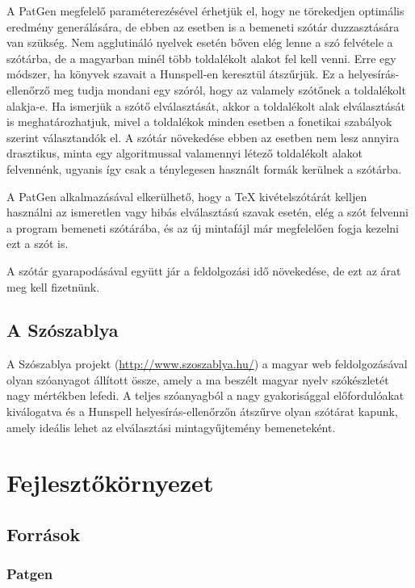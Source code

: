 \documentclass[12pt]{article}
\begin{document}
A PatGen megfelelő paraméterezésével érhetjük el, hogy ne törekedjen
optimális eredmény generálására, de ebben az esetben is a bemeneti
szótár duzzasztására van szükség. Nem agglutináló nyelvek esetén bőven
elég lenne a szó felvétele a szótárba, de a magyarban minél több toldalékolt
alakot fel kell venni. Erre egy módszer, ha könyvek szavait a Hunspell-en
keresztül átszűrjük. Ez a helyesírás-ellenőrző meg tudja mondani egy
szóról, hogy az valamely szótőnek a toldalékolt alakja-e. Ha ismerjük
a szótő elválasztását, akkor a toldalékolt alak elválasztását is meghatározhatjuk,
mivel a toldalékok minden esetben a fonetikai szabályok szerint választandók
el. A szótár növekedése ebben az esetben nem lesz annyira drasztikus,
minta egy algoritmussal valamennyi létező toldalékolt alakot felvennénk,
ugyanis így csak a ténylegesen használt formák kerülnek a szótárba.

A PatGen alkalmazásával elkerülhető, hogy a \TeX{} kivételszótárát
kelljen használni az ismeretlen vagy hibás elválasztású szavak esetén,
elég a szót felvenni a program bemeneti szótárába, és az új mintafájl
már megfelelően fogja kezelni ezt a szót is.

A szótár gyarapodásával együtt jár a feldolgozási idő növekedése,
de ezt az árat meg kell fizetnünk.


\subsection{A Szószablya}

A Szószablya projekt (\url{http://www.szoszablya.hu/}) a magyar web
feldolgozásával olyan szóanyagot állított össze, amely a ma beszélt
magyar nyelv szókészletét nagy mértékben lefedi. A teljes szóanyagból
a nagy gyakorisággal előfordulóakat kiválogatva és a Hunspell helyesírás-ellenőrzőn
átszűrve olyan szótárat kapunk, amely ideális lehet az elválasztási
mintagyűjtemény bemeneteként.


\section{Fejlesztőkörnyezet}


\subsection{Források}


\subsubsection{Patgen}
\end{document}
